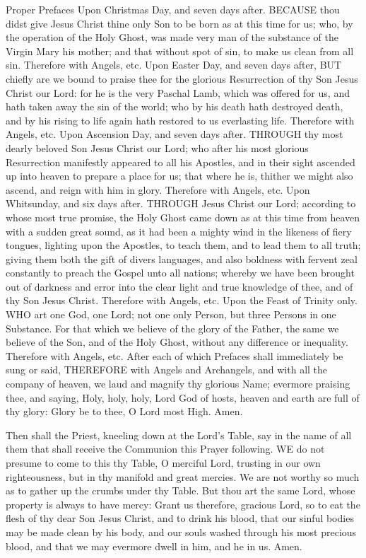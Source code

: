 Proper Prefaces
Upon Christmas Day, and seven days after.
BECAUSE thou didst give Jesus Christ thine only Son to be born as at this time for us; who, by the operation of the Holy Ghost, was made very man of the substance of the Virgin Mary his mother; and that without spot of sin, to make us clean from all sin. Therefore with Angels, etc.
Upon Easter Day, and seven days after,
BUT chiefly are we bound to praise thee for the glorious Resurrection of thy Son Jesus Christ our Lord: for he is the very Paschal Lamb, which was offered for us, and hath taken away the sin of the world; who by his death hath destroyed death, and by his rising to life again hath restored to us everlasting life. Therefore with Angels, etc.
Upon Ascension Day, and seven days after.
THROUGH thy most dearly beloved Son Jesus Christ our Lord; who after his most glorious Resurrection manifestly appeared to all his Apostles, and in their sight ascended up into heaven to prepare a place for us; that where he is, thither we might also ascend, and reign with him in glory. Therefore with Angels, etc.
Upon Whitsunday, and six days after.
THROUGH Jesus Christ our Lord; according to whose most true promise, the Holy Ghost came down as at this time from heaven with a sudden great sound, as it had been a mighty wind in the likeness of fiery tongues, lighting upon the Apostles, to teach them, and to lead them to all truth; giving them both the gift of divers languages, and also boldness with fervent zeal constantly to preach the Gospel unto all nations; whereby we have been brought out of darkness and error into the clear light and true knowledge of thee, and of thy Son Jesus Christ. Therefore with Angels, etc.
Upon the Feast of Trinity only.
WHO art one God, one Lord; not one only Person, but three Persons in one Substance. For that which we believe of the glory of the Father, the same we believe of the Son, and of the Holy Ghost, without any difference or inequality. Therefore with Angels, etc.
After each of which Prefaces shall immediately be sung or said,
THEREFORE with Angels and Archangels, and with all the company of heaven, we laud and magnify thy glorious Name; evermore praising thee, and saying, Holy, holy, holy, Lord God of hosts, heaven and earth are full of thy glory: Glory be to thee, O Lord most High. Amen.

Then shall the Priest, kneeling down at the Lord's Table, say in the name of all them that shall receive the Communion this Prayer following.
WE do not presume to come to this thy Table, O merciful Lord, trusting in our own righteousness, but in thy manifold and great mercies. We are not worthy so much as to gather up the crumbs under thy Table. But thou art the same Lord, whose property is always to have mercy: Grant us therefore, gracious Lord, so to eat the flesh of thy dear Son Jesus Christ, and to drink his blood, that our sinful bodies may be made clean by his body, and our souls washed through his most precious blood, and that we may evermore dwell in him, and he in us. Amen.

